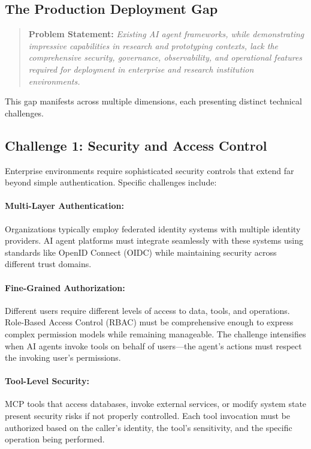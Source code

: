 \documentclass[a4paper,twoside]{sapthesis}
\begin{document}
\subsection{The Production Deployment Gap}

\begin{quote}
\textbf{Problem Statement:} \emph{Existing AI agent frameworks, while demonstrating impressive capabilities in research and prototyping contexts, lack the comprehensive security, governance, observability, and operational features required for deployment in enterprise and research institution environments.}
\end{quote}

This gap manifests across multiple dimensions, each presenting distinct technical challenges.

\subsection{Challenge 1: Security and Access Control}

Enterprise environments require sophisticated security controls that extend far beyond simple authentication. Specific challenges include:

\paragraph{Multi-Layer Authentication:}
Organizations typically employ federated identity systems with multiple identity providers. AI agent platforms must integrate seamlessly with these systems using standards like OpenID Connect (OIDC) while maintaining security across different trust domains.

\paragraph{Fine-Grained Authorization:}
Different users require different levels of access to data, tools, and operations. Role-Based Access Control (RBAC) must be comprehensive enough to express complex permission models while remaining manageable. The challenge intensifies when AI agents invoke tools on behalf of users---the agent's actions must respect the invoking user's permissions.

\paragraph{Tool-Level Security:}
MCP tools that access databases, invoke external services, or modify system state present security risks if not properly controlled. Each tool invocation must be authorized based on the caller's identity, the tool's sensitivity, and the specific operation being performed.
\end{document}
